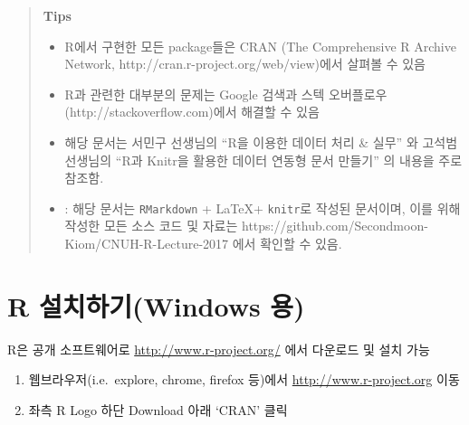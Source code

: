 \documentclass[12pt,a4paper]{book}
\providecommand{\tightlist}{%
  \setlength{\itemsep}{0pt}\setlength{\parskip}{0pt}}
\newcommand{\latex}{\LaTeX\xspace}
\theoremstyle{definition}
\theoremstyle{definition}
\theoremstyle{definition}
\theoremstyle{remark}
\begin{document}
\begin{quote}
\colorbox{gray!10}{\begin{minipage}{15cm}
\textbf{Tips}
  \begin{itemize}
    \item R에서 구현한 모든 package들은 CRAN (The Comprehensive R Archive Network, http://cran.r-project.org/web/view)에서 살펴볼 수 있음
    \item R과 관련한 대부분의 문제는 Google 검색과 스텍 오버플로우(http://stackoverflow.com)에서 해결할 수 있음
    \item 해당 문서는 서민구 선생님의 ``R을 이용한 데이터 처리 \& 실무'' \citep{Seo-2014} 와 고석범 선생님의 ``R과 Knitr을 활용한 데이터 연동형 문서 만들기'' \citep{Ko-2014} 의 내용을 주로 참조함. 
    \item: 해당 문서는 \texttt{RMarkdown} + \latex + \texttt{knitr}로 작성된 문서이며, 이를 위해 작성한 모든 소스 코드 및 자료는 https://github.com/Secondmoon-Kiom/CNUH-R-Lecture-2017 에서 확인할 수 있음. 
  \end{itemize}
\end{minipage}}
\end{quote}

\newpage

\section{R 설치하기(Windows 용)}\label{r-windows-}

R은 공개 소프트웨어로 \url{http://www.r-project.org/} 에서 다운로드 및
설치 가능

\begin{enumerate}
\def\labelenumi{\arabic{enumi}.}
\tightlist
\item
  웹브라우저(i.e.~explore, chrome, firefox 등)에서
  \url{http://www.r-project.org} 이동
\item
  좌측 R Logo 하단 Download 아래 `CRAN' 클릭
\end{enumerate}
\end{document}
